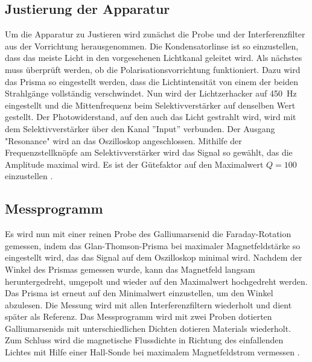 \subsection{Justierung der Apparatur}
\label{subsec:Justierung}

Um die Apparatur zu Justieren wird zunächst die Probe und der Interferenzfilter aus der Vorrichtung herausgenommen. Die Kondensatorlinse ist so einzustellen, dass das meiste Licht in
den vorgesehenen Lichtkanal geleitet wird.
Als nächstes muss überprüft werden, ob die Polarisationsvorrichtung funktioniert. Dazu wird das Prisma so eingestellt werden, dass die Lichtintensität von einem 
der beiden Strahlgänge vollständig verschwindet.
Nun wird der Lichtzerhacker auf \SI{450}{\hertz} eingestellt und die Mittenfrequenz beim Selektivverstärker auf denselben Wert gestellt.
Der Photowiderstand, auf den auch das Licht gestrahlt wird, wird mit dem Selektivverstärker über den Kanal ''Input'' verbunden. Der Ausgang "Resonance" 
wird an das Oszilloskop angeschlossen. Mithilfe der Frequenzstellknöpfe am Selektivverstärker wird das Signal so gewählt, das die Amplitude maximal wird.
Es ist der Gütefaktor auf den Maximalwert $Q=100$ einzustellen \cite{Anleitung46}.

\subsection{Messprogramm}
\label{subsec:Messprogramm}

Es wird nun mit einer reinen Probe des Galliumarsenid die Faraday-Rotation gemessen, indem das Glan-Thomson-Prisma bei maximaler Magnetfeldstärke so eingestellt wird,
das das Signal auf dem Oszilloskop minimal wird. Nachdem der Winkel des Prismas gemessen wurde, kann das Magnetfeld langsam heruntergedreht, umgepolt und wieder auf
den Maximalwert hochgedreht werden. Das Prisma ist erneut auf den Minimalwert einzustellen, um den Winkel abzulesen. Die Messung wird mit allen Interferenzfiltern 
wiederholt und dient später als Referenz. \newline
Das Messprogramm wird mit zwei Proben dotierten Galliumarsenids mit unterschiedlichen Dichten dotieren Materials wiederholt.
Zum Schluss wird die magnetische Flussdichte in Richtung des einfallenden Lichtes mit Hilfe einer Hall-Sonde bei maximalem Magnetfeldstrom vermessen \cite{Anleitung46}.
